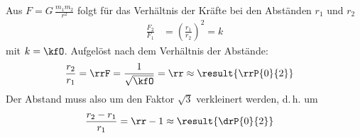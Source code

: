 Aus $F = G\,\frac{m_1 m_2}{r^2}$ folgt für das Verhältnis der Kräfte bei den Abständen $r_1$ und $r_2$
\begin{align}
 \frac{F_2}{F_1} &= \left(\frac{r_1}{r_2}\right)^2 = k
\end{align}
mit $k = \kfO$. Aufgelöst nach dem Verhältnis der Abstände:
\begin{align}
 \frac{r_2}{r_1} &= \rrF = \frac{1}{\sqrt{\kfO}} = \rr \approx \result{\rrP{0}{2}}
\end{align}
Der Abstand muss also um den Faktor $\sqrt{3}$ verkleinert werden, d.\,h. um
\begin{align}
 \frac{r_2-r_1}{r_1} &= \rr-1 \approx \result{\drP{0}{2}}
\end{align}
